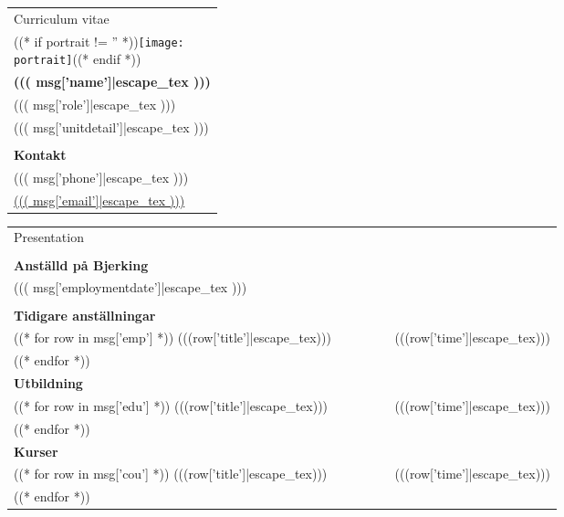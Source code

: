 \documentclass[a4paper, 10pt]{article}
\newcommand{\unitdetail}{((( msg['unitdetail']|escape_tex )))} %
\newcommand{\name}{((( msg['name']|escape_tex )))} %
\newcommand{\role}{((( msg['role']|escape_tex )))} %
\newcommand{\phone}{((( msg['phone']|escape_tex )))} %
\newcommand{\email}{((( msg['email']|escape_tex )))} %
\newcommand{\employmentyear}{((( msg['employmentdate']|escape_tex )))} %
\newcommand{\presentation}{((* if msg['presentation'] is defined *)) ((( msg['presentation']|escape_tex ))) ((* endif *))} %
\newcommand{\portrait}{((* if portrait is defined *))(((portrait|escape_tex)))((* endif *))} %
\begin{document}
\thispagestyle{presentation}
\pagestyle{plain}
\noindent
\begin{minipage}[t]{0.3\textwidth}
    \strut\vspace*{-\baselineskip}\newline
    \begin{tabular*}{1\linewidth}{p{1\linewidth}}
        {\LARGE Curriculum vitae}\\
        ((* if portrait != '' *))\texttt{[image: \\portrait]}((* endif *)) \\
        \textbf{\name} \\
        \role{} \\
        \unitdetail{} \\
        \\
        \textbf{Kontakt} \\
        \phone{} \\
        \href{mailto:\email}{\email} \\
    \end{tabular*}
\end{minipage}%
\hfill
\begin{minipage}[t]{0.6\textwidth}
    \strut\vspace*{-\baselineskip}\newline
    \begin{tabular*}{1\linewidth}{p{0.7\linewidth} r}
        {\Large Presentation} & \\
        \mc{2}{\parbox{1\linewidth}{\presentation{}}} \\
        \textbf{Anställd på Bjerking} & \\
        \employmentyear & \\
        & \\
        \textbf{Tidigare anställningar}& \\
        ((* for row in msg['emp'] *))
        (((row['title']|escape_tex))) & (((row['time']|escape_tex))) \\
        ((* endfor *))
        & \\
        \textbf{Utbildning} & \\
        ((* for row in msg['edu'] *))
        (((row['title']|escape_tex))) & (((row['time']|escape_tex))) \\
        ((* endfor *))
        & \\
        \textbf{Kurser}& \\
        ((* for row in msg['cou'] *))
        (((row['title']|escape_tex))) & (((row['time']|escape_tex))) \\
        ((* endfor *))
    \end{tabular*}
\end{minipage}
\end{document}
